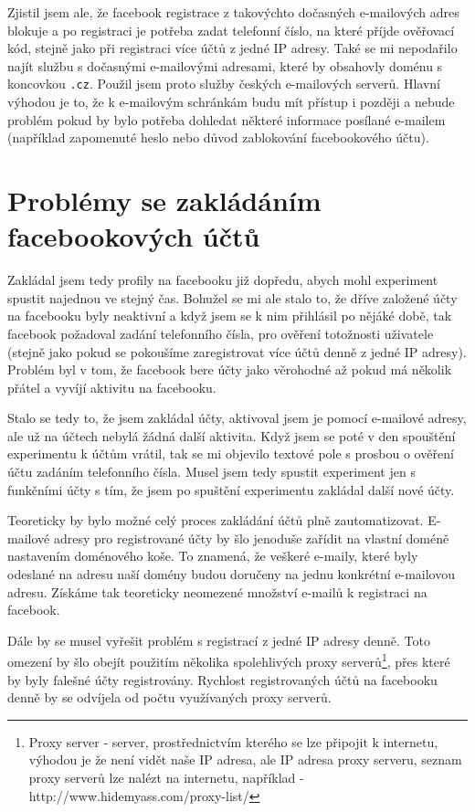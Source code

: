 \documentclass[thesis=M,czech]{FITthesis}[2013/05/10]
\begin{document}
Zjistil jsem ale, že facebook registrace z takovýchto dočasných e-mailových adres blokuje a po registraci je potřeba zadat telefonní číslo, na které příjde ověřovací kód, stejně jako při registraci více účtů z jedné IP adresy. Také se mi nepodařilo najít službu s dočasnými e-mailovými adresami, které by obsahovly doménu s koncovkou \verb|.cz|. Použil jsem proto služby českých e-mailových serverů. Hlavní výhodou je to, že k e-mailovým schránkám budu mít přístup i později a nebude problém pokud by bylo potřeba dohledat některé informace posílané e-mailem (například zapomenuté heslo nebo důvod zablokování facebookového účtu).

\section{Problémy se zakládáním facebookových účtů}

Zakládal jsem tedy profily na facebooku již dopředu, abych mohl experiment spustit najednou ve stejný čas. 
Bohužel se mi ale stalo to, že dříve založené účty na facebooku byly neaktivní a když jsem se k nim přihlásil po nějáké době, tak facebook požadoval zadání telefonního čísla, pro ověření totožnosti uživatele (stejně jako pokud se pokoušíme zaregistrovat více účtů denně z jedné IP adresy). Problém byl v tom, že facebook bere účty jako věrohodné až   pokud má několik přátel a vyvíjí aktivitu na facebooku.

Stalo se tedy to, že jsem zakládal účty, aktivoval jsem je pomocí e-mailové adresy, ale už na účtech nebylá žádná další aktivita. Když jsem se poté v den spouštění experimentu k účtům vrátil, tak se mi objevilo textové pole s prosbou o ověření účtu zadáním telefonního čísla. Musel jsem tedy spustit experiment jen s funkčními účty s tím, že jsem po spuštění experimentu zakládal další nové účty.

Teoreticky by bylo možné celý proces zakládání účtů plně zautomatizovat. E-mailové adresy pro registrované účty by šlo jenoduše zařídit na vlastní doméně nastavením doménového koše. To znamená, že veškeré e-maily, které byly odeslané na adresu naší domény budou doručeny na jednu konkrétní e-mailovou adresu. Získáme tak teoreticky neomezené množství e-mailů k registraci na facebook.

Dále by se musel vyřešit problém s registrací z jedné IP adresy denně. Toto omezení by šlo obejít použitím několika spolehlivých proxy serverů\footnote{Proxy server - server, prostřednictvím kterého se lze připojit k internetu, výhodou je že není vidět naše IP adresa, ale IP adresa proxy serveru, seznam proxy serverů lze nalézt na internetu, například - http://www.hidemyass.com/proxy-list/}, přes které by byly falešné účty registrovány. Rychlost registrovaných účtů na facebooku denně by se odvíjela od počtu využívaných proxy serverů. 
\end{document}
